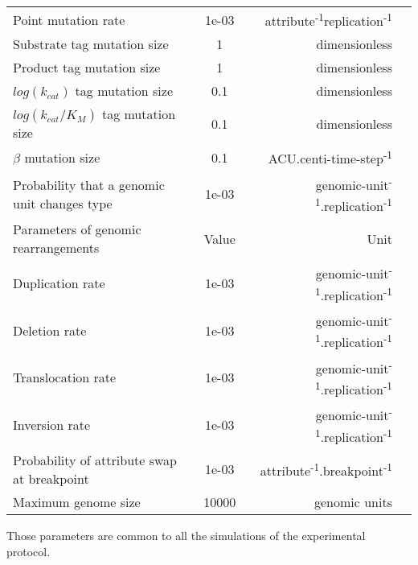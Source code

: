 \begin{table}[!ht]
{\begin{tabular}{|l|c|r|r|}
\hline
Point mutation rate & 1e-03 & attribute\textsuperscript{-1}replication\textsuperscript{-1}\\
Substrate tag mutation size & 1 & dimensionless\\
Product tag mutation size & 1 & dimensionless\\
$log(k_{cat})$ tag mutation size & 0.1 &dimensionless\\
$log(k_{cat}/K_M)$ tag mutation size & 0.1 & dimensionless\\
$\beta$ mutation size & 0.1 & ACU.centi-time-step\textsuperscript{-1}\\
Probability that a genomic unit changes type & 1e-03 & genomic-unit\textsuperscript{-1}.replication\textsuperscript{-1}\\
\hline
Parameters of genomic rearrangements & Value & Unit\\
\hline
Duplication rate & 1e-03 & genomic-unit\textsuperscript{-1}.replication\textsuperscript{-1}\\
Deletion rate & 1e-03 & genomic-unit\textsuperscript{-1}.replication\textsuperscript{-1}\\
Translocation rate & 1e-03 & genomic-unit\textsuperscript{-1}.replication\textsuperscript{-1}\\
Inversion rate & 1e-03 & genomic-unit\textsuperscript{-1}.replication\textsuperscript{-1}\\
Probability of attribute swap at breakpoint & 1e-03 & attribute\textsuperscript{-1}.breakpoint\textsuperscript{-1}\\
Maximum genome size & 10000 & genomic units\\
\hline
\end{tabular}}
\begin{center} Those parameters are common to all the simulations of the experimental protocol.
\end{center}
\end{table}
